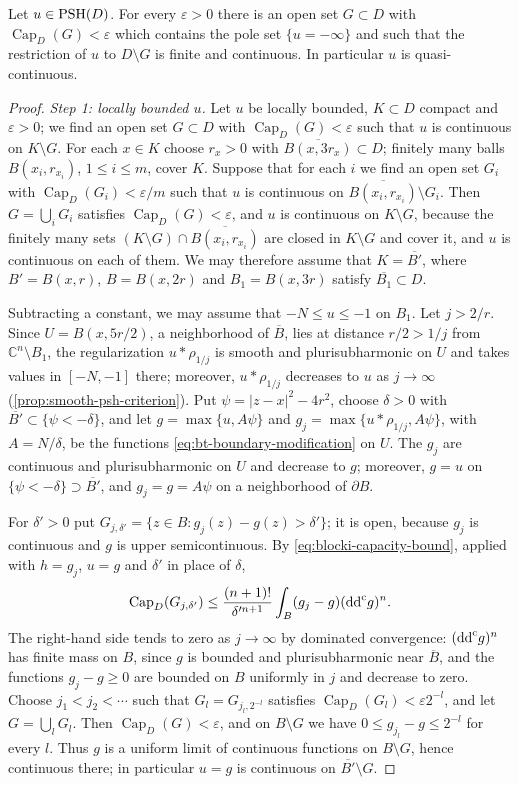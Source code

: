 \begin{theorem}\label{thm:psh-capacity-quasicontinuity}
Let $u\in\mathrm{PSH}(D)$. For every $\varepsilon>0$ there is an open set $G\subset D$ with $\operatorname{Cap}_D(G)<\varepsilon$ which contains the pole set $\{u=-\infty\}$ and such that the restriction of $u$ to $D\setminus G$ is finite and continuous. In particular $u$ is quasi-continuous.
\end{theorem}
\begin{proof}
\emph{Step 1: locally bounded $u$.} Let $u$ be locally bounded, $K\subset D$ compact and $\varepsilon>0$; we find an open set $G\subset D$ with $\operatorname{Cap}_D(G)<\varepsilon$ such that $u$ is continuous on $K\setminus G$. For each $x\in K$ choose $r_x>0$ with $\overline{B(x,3r_x)}\subset D$; finitely many balls $B(x_i,r_{x_i})$, $1\le i\le m$, cover $K$. Suppose that for each $i$ we find an open set $G_i$ with $\operatorname{Cap}_D(G_i)<\varepsilon/m$ such that $u$ is continuous on $\overline{B(x_i,r_{x_i})}\setminus G_i$. Then $G=\bigcup_iG_i$ satisfies $\operatorname{Cap}_D(G)<\varepsilon$, and $u$ is continuous on $K\setminus G$, because the finitely many sets $(K\setminus G)\cap\overline{B(x_i,r_{x_i})}$ are closed in $K\setminus G$ and cover it, and $u$ is continuous on each of them. We may therefore assume that $K=\overline{B'}$, where $B'=B(x,r)$, $B=B(x,2r)$ and $B_1=B(x,3r)$ satisfy $\overline{B_1}\subset D$.

Subtracting a constant, we may assume that $-N\le u\le-1$ on $B_1$. Let $j>2/r$. Since $U=B(x,5r/2)$, a neighborhood of $\overline B$, lies at distance $r/2>1/j$ from $\mathbb C^n\setminus B_1$, the regularization $u*\rho_{1/j}$ is smooth and plurisubharmonic on $U$ and takes values in $[-N,-1]$ there; moreover, $u*\rho_{1/j}$ decreases to $u$ as $j\to\infty$ (\cref{prop:smooth-psh-criterion}). Put $\psi=|z-x|^2-4r^2$, choose $\delta>0$ with $\overline{B'}\subset\{\psi<-\delta\}$, and let $g=\max\{u,A\psi\}$ and $g_j=\max\{u*\rho_{1/j},A\psi\}$, with $A=N/\delta$, be the functions \eqref{eq:bt-boundary-modification} on $U$. The $g_j$ are continuous and plurisubharmonic on $U$ and decrease to $g$; moreover, $g=u$ on $\{\psi<-\delta\}\supset\overline{B'}$, and $g_j=g=A\psi$ on a neighborhood of $\partial B$.

For $\delta'>0$ put $G_{j,\delta'}=\{z\in B:g_j(z)-g(z)>\delta'\}$; it is open, because $g_j$ is continuous and $g$ is upper semicontinuous. By \eqref{eq:blocki-capacity-bound}, applied with $h=g_j$, $u=g$ and $\delta'$ in place of $\delta$,
\[
 \operatorname{Cap}_D(G_{j,\delta'})\le\frac{(n+1)!}{\delta'^{n+1}}\int_B(g_j-g)(\mathrm{dd}^{\mathrm{c}} g)^n.
\]
The right-hand side tends to zero as $j\to\infty$ by dominated convergence: $(\mathrm{dd}^{\mathrm{c}} g)^n$ has finite mass on $B$, since $g$ is bounded and plurisubharmonic near $\overline B$, and the functions $g_j-g\ge0$ are bounded on $B$ uniformly in $j$ and decrease to zero. Choose $j_1<j_2<\cdots$ such that $G_l=G_{j_l,2^{-l}}$ satisfies $\operatorname{Cap}_D(G_l)<\varepsilon2^{-l}$, and let $G=\bigcup_lG_l$. Then $\operatorname{Cap}_D(G)<\varepsilon$, and on $B\setminus G$ we have $0\le g_{j_l}-g\le2^{-l}$ for every $l$. Thus $g$ is a uniform limit of continuous functions on $B\setminus G$, hence continuous there; in particular $u=g$ is continuous on $\overline{B'}\setminus G$.


\end{proof}
